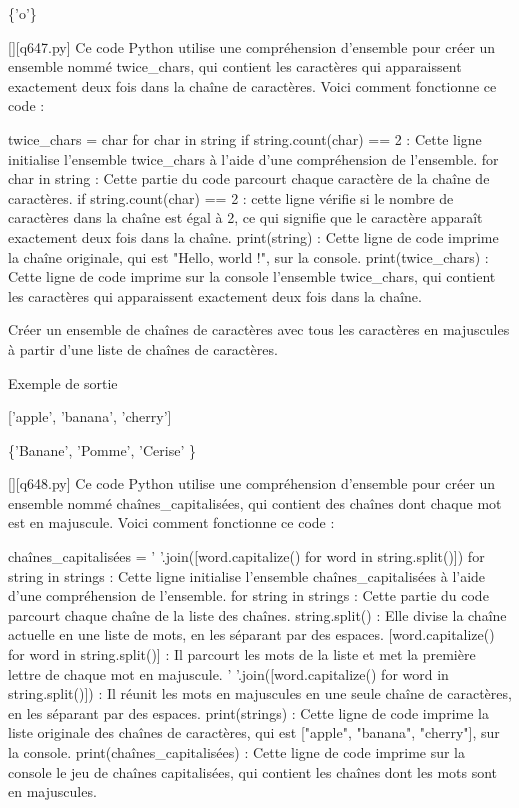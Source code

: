 \{'o'\}
        \par
        \begin{solution}
            \renewcommand{\nomfichier}{q647.py}
            \pythonfile{\chemincode \nomfichier}[][\nomfichier]
            Ce code Python utilise une compréhension d'ensemble pour créer un ensemble nommé twice_chars, qui contient les caractères qui apparaissent exactement deux fois dans la chaîne de caractères. Voici comment fonctionne ce code :

    twice_chars = {char for char in string if string.count(char) == 2} : Cette ligne initialise l'ensemble twice_chars à l'aide d'une compréhension de l'ensemble.
        for char in string : Cette partie du code parcourt chaque caractère de la chaîne de caractères.
        if string.count(char) == 2 : cette ligne vérifie si le nombre de caractères dans la chaîne est égal à 2, ce qui signifie que le caractère apparaît exactement deux fois dans la chaîne.
    print(string) : Cette ligne de code imprime la chaîne originale, qui est "Hello, world !", sur la console.
    print(twice_chars) : Cette ligne de code imprime sur la console l'ensemble twice_chars, qui contient les caractères qui apparaissent exactement deux fois dans la chaîne.
        \end{solution}
        

        \question
        Créer un ensemble de chaînes de caractères avec tous les caractères en majuscules à partir d'une liste de chaînes de caractères.

Exemple de sortie

['apple', 'banana', 'cherry']

\{'Banane', 'Pomme', 'Cerise' \}
        \par
        \begin{solution}
            \renewcommand{\nomfichier}{q648.py}
            \pythonfile{\chemincode \nomfichier}[][\nomfichier]
            Ce code Python utilise une compréhension d'ensemble pour créer un ensemble nommé chaînes_capitalisées, qui contient des chaînes dont chaque mot est en majuscule. Voici comment fonctionne ce code :

    chaînes_capitalisées = {' '.join([word.capitalize() for word in string.split()]) for string in strings} : Cette ligne initialise l'ensemble chaînes_capitalisées à l'aide d'une compréhension de l'ensemble.
        for string in strings : Cette partie du code parcourt chaque chaîne de la liste des chaînes.
        string.split() : Elle divise la chaîne actuelle en une liste de mots, en les séparant par des espaces.
        [word.capitalize() for word in string.split()] : Il parcourt les mots de la liste et met la première lettre de chaque mot en majuscule.
        ' '.join([word.capitalize() for word in string.split()]) : Il réunit les mots en majuscules en une seule chaîne de caractères, en les séparant par des espaces.
    print(strings) : Cette ligne de code imprime la liste originale des chaînes de caractères, qui est ["apple", "banana", "cherry"], sur la console.
    print(chaînes_capitalisées) : Cette ligne de code imprime sur la console le jeu de chaînes capitalisées, qui contient les chaînes dont les mots sont en majuscules.
        \end{solution}
        


